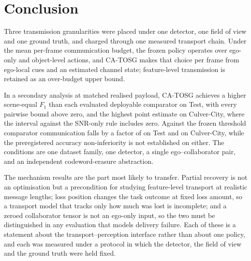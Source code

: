 \documentclass[journal]{IEEEtran}
\newcommand{\method}{CA-TOSG}
\begin{document}
\section{Conclusion}
Three transmission granularities were placed under one detector, one field of view and one ground
truth, and charged through one measured transport chain. Under the mean per-frame communication budget, the
frozen policy operates over ego-only and object-level actions, and \method{} makes that choice per
frame from ego-local cues and an estimated channel state; feature-level transmission is retained as
an over-budget upper bound.

In a secondary analysis at matched realised payload, \method{} achieves a higher scene-equal $F_1$
than each evaluated deployable comparator on Test, with every pairwise bound above zero, and the
highest point estimate on Culver-City, where the interval against the SNR-only rule includes zero.
Against the frozen threshold comparator communication falls by a factor of \TestRatio{} on Test and
\CulverRatio{} on Culver-City, while the preregistered accuracy non-inferiority is not established
on either. The conditions are one dataset family, one detector, a single ego--collaborator pair,
and an independent codeword-erasure abstraction.

The mechanism results are the part most likely to transfer. Partial recovery is not an optimisation
but a precondition for studying feature-level transport at realistic message lengths; loss position
changes the task outcome at fixed loss amount, so a transport model that tracks only how much was
lost is incomplete; and a zeroed collaborator tensor is not an ego-only input, so the two must be
distinguished in any evaluation that models delivery failure. Each of these is a statement about the
transport--perception interface rather than about one policy, and each was measured under a protocol
in which the detector, the field of view and the ground truth were held fixed.



\end{document}
